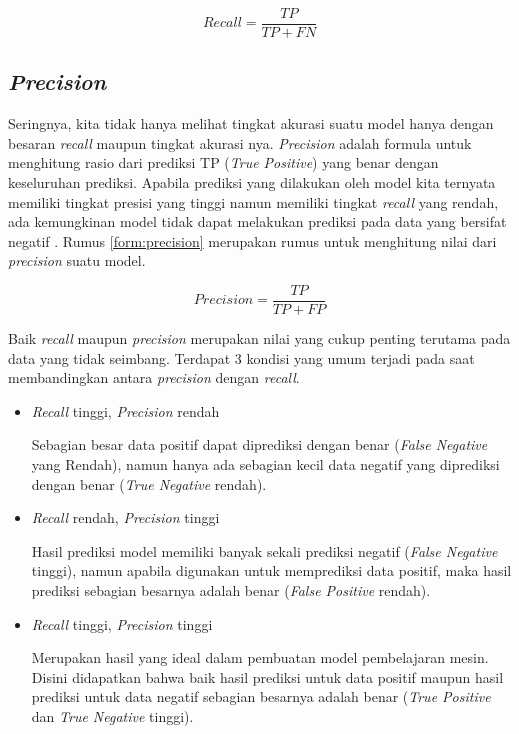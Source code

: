 \begin{equation}
    Recall = \frac{TP}{TP+FN}
    \label{form:recall}
\end{equation}

\subsection{\textit{Precision}}

Seringnya, kita tidak hanya melihat tingkat akurasi suatu model hanya dengan besaran \textit{recall} maupun tingkat akurasi nya. \textit{Precision} adalah formula untuk menghitung rasio dari prediksi TP (\textit{True Positive}) yang benar dengan keseluruhan prediksi. Apabila prediksi yang dilakukan oleh model kita ternyata memiliki tingkat presisi yang tinggi namun memiliki tingkat \textit{recall} yang rendah, ada kemungkinan model tidak dapat melakukan prediksi pada data yang bersifat negatif \cite{metrics_ml}. Rumus \ref{form:precision} merupakan rumus untuk menghitung nilai dari \textit{precision} suatu model.

\begin{equation}
    Precision = \frac{TP}{TP+FP}
    \label{form:precision}
\end{equation}

Baik \textit{recall} maupun \textit{precision} merupakan nilai yang cukup penting terutama pada data yang tidak seimbang. Terdapat 3 kondisi yang umum terjadi pada saat membandingkan antara \textit{precision} dengan \textit{recall}.

\begin{itemize}
    \item \textit{Recall} tinggi, \textit{Precision} rendah

          Sebagian besar data positif dapat diprediksi dengan benar (\textit{False Negative} yang Rendah), namun hanya ada sebagian kecil data negatif yang diprediksi dengan benar (\textit{True Negative} rendah).

    \item \textit{Recall} rendah, \textit{Precision} tinggi

          Hasil prediksi model memiliki banyak sekali prediksi negatif (\textit{False Negative} tinggi), namun apabila digunakan untuk memprediksi data positif, maka hasil prediksi sebagian besarnya adalah benar (\textit{False Positive} rendah).

    \item \textit{Recall} tinggi, \textit{Precision} tinggi

          Merupakan hasil yang ideal dalam pembuatan model pembelajaran mesin. Disini didapatkan bahwa baik hasil prediksi untuk data positif maupun hasil prediksi untuk data negatif sebagian besarnya adalah benar (\textit{True Positive} dan \textit{True Negative} tinggi).

\end{itemize}

